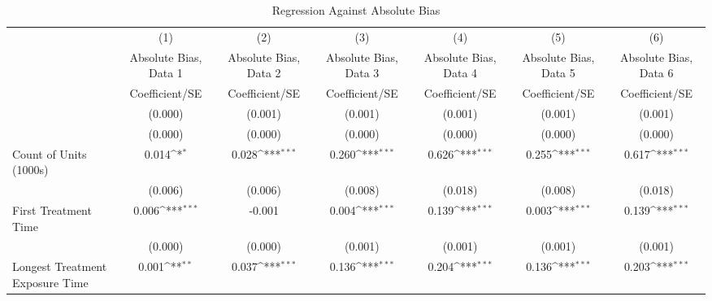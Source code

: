 \begin{table}[htbp]\centering
\def\sym#1{\ifmmode^{#1}\else\(^{#1}\)\fi}
\caption{Regression Against Absolute Bias}
\begin{tabular}{l*{6}{c}}
\hline\hline
                    &\multicolumn{1}{c}{(1)}&\multicolumn{1}{c}{(2)}&\multicolumn{1}{c}{(3)}&\multicolumn{1}{c}{(4)}&\multicolumn{1}{c}{(5)}&\multicolumn{1}{c}{(6)}\\
                    &\multicolumn{1}{c}{Absolute Bias, Data 1}&\multicolumn{1}{c}{Absolute Bias, Data 2}&\multicolumn{1}{c}{Absolute Bias, Data 3}&\multicolumn{1}{c}{Absolute Bias, Data 4}&\multicolumn{1}{c}{Absolute Bias, Data 5}&\multicolumn{1}{c}{Absolute Bias, Data 6}\\
                    &Coefficient/SE         &Coefficient/SE         &Coefficient/SE         &Coefficient/SE         &Coefficient/SE         &Coefficient/SE         \\
\hline
                    &     (0.000)         &     (0.001)         &     (0.001)         &     (0.001)         &     (0.001)         &     (0.001)         \\
                    &     (0.000)         &     (0.000)         &     (0.000)         &     (0.000)         &     (0.000)         &     (0.000)         \\
Count of Units (1000s)&       0.014\sym{*}  &       0.028\sym{***}&       0.260\sym{***}&       0.626\sym{***}&       0.255\sym{***}&       0.617\sym{***}\\
                    &     (0.006)         &     (0.006)         &     (0.008)         &     (0.018)         &     (0.008)         &     (0.018)         \\
First Treatment Time&       0.006\sym{***}&      -0.001         &       0.004\sym{***}&       0.139\sym{***}&       0.003\sym{***}&       0.139\sym{***}\\
                    &     (0.000)         &     (0.000)         &     (0.001)         &     (0.001)         &     (0.001)         &     (0.001)         \\
Longest Treatment Exposure Time&       0.001\sym{**} &       0.037\sym{***}&       0.136\sym{***}&       0.204\sym{***}&       0.136\sym{***}&       0.203\sym{***}\\

\end{tabular}
\end{table}
